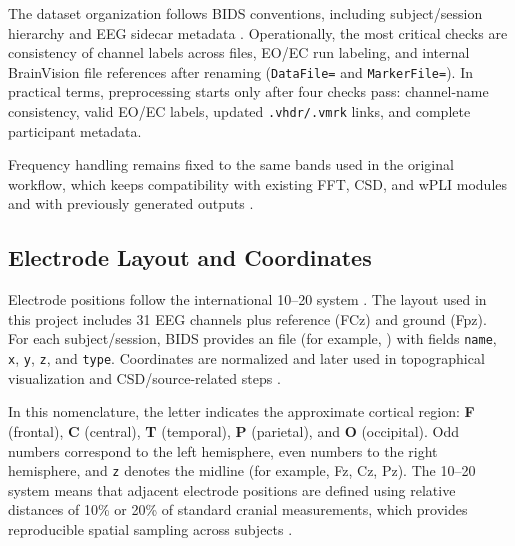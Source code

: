The dataset organization follows BIDS conventions, including subject/session hierarchy and EEG sidecar metadata \citep{Yamada2018}. Operationally, the most critical checks are consistency of channel labels across files, EO/EC run labeling, and internal BrainVision file references after renaming (\texttt{DataFile=} and \texttt{MarkerFile=}). In practical terms, preprocessing starts only after four checks pass: channel-name consistency, valid EO/EC labels, updated \texttt{.vhdr/.vmrk} links, and complete participant metadata.

Frequency handling remains fixed to the same bands used in the original workflow, which keeps compatibility with existing FFT, CSD, and wPLI modules and with previously generated outputs \citep{Cohen2014,Sanei2022,Ruth2020}.

\subsection{Electrode Layout and Coordinates}

Electrode positions follow the international 10--20 system \citep{Yamada2018,IriarteFranco2013}. The layout used in this project includes 31 EEG channels plus reference (FCz) and ground (Fpz). For each subject/session, BIDS provides an  file (for example, ) with fields \texttt{name}, \texttt{x}, \texttt{y}, \texttt{z}, and \texttt{type}. Coordinates are normalized and later used in topographical visualization and CSD/source-related steps \citep{Cohen2014}.

In this nomenclature, the letter indicates the approximate cortical region: \textbf{F} (frontal), \textbf{C} (central), \textbf{T} (temporal), \textbf{P} (parietal), and \textbf{O} (occipital). Odd numbers correspond to the left hemisphere, even numbers to the right hemisphere, and \texttt{z} denotes the midline (for example, Fz, Cz, Pz). The 10--20 system means that adjacent electrode positions are defined using relative distances of 10\% or 20\% of standard cranial measurements, which provides reproducible spatial sampling across subjects \citep{Yamada2018,IriarteFranco2013}.

